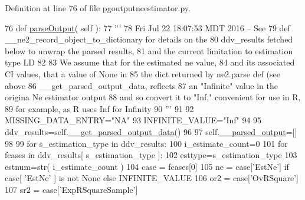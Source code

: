 Definition at line 76 of file pgoutputneestimator.\+py.


\begin{DoxyCode}
76     \textcolor{keyword}{def }\hyperlink{classnegui_1_1pgoutputneestimator_1_1PGOutputNeEstimator_a7b6885cf565cb604ab24d7082858f57b}{parseOutput}( self ):
77         \textcolor{stringliteral}{'''}
78 \textcolor{stringliteral}{        Fri Jul 22 18:07:53 MDT 2016 -- See }
79 \textcolor{stringliteral}{        def \_\_ne2\_record\_object\_to\_dictionary for details on the}
80 \textcolor{stringliteral}{        ddv\_results fetched below to unwrap the parsed results,}
81 \textcolor{stringliteral}{        and the current limitation to estimation type LD}
82 \textcolor{stringliteral}{}
83 \textcolor{stringliteral}{        We assume that for the estimated ne value,}
84 \textcolor{stringliteral}{        and its associated CI values, that a value of None in}
85 \textcolor{stringliteral}{        the dict returned by ne2.parse def (see above }
86 \textcolor{stringliteral}{        \_\_get\_parsed\_output\_data, reflects}
87 \textcolor{stringliteral}{        an "Infinite" value in the origina Ne estimator output}
88 \textcolor{stringliteral}{        and so convert it to "Inf,"  convenient for use in R,}
89 \textcolor{stringliteral}{        for example, as R uses Inf for Infinity}
90 \textcolor{stringliteral}{        '''}
91 
92         MISSING\_DATA\_ENTRY=\textcolor{stringliteral}{"NA"}
93         INFINITE\_VALUE=\textcolor{stringliteral}{"Inf"}
94 
95         ddv\_results=self.\hyperlink{classnegui_1_1pgoutputneestimator_1_1PGOutputNeEstimator_a70fbaa3f31f7d7c3ec0fdea15e923680}{\_\_get\_parsed\_output\_data}()
96 
97         self.\hyperlink{classnegui_1_1pgoutputneestimator_1_1PGOutputNeEstimator_a3579f427ddfe05902a6f4e3301704191}{\_\_parsed\_output}=[]
98 
99         \textcolor{keywordflow}{for} s\_estimation\_type \textcolor{keywordflow}{in} ddv\_results:
100             i\_estimate\_count=0
101             \textcolor{keywordflow}{for} fcases \textcolor{keywordflow}{in} ddv\_results[ s\_estimation\_type ]:
102                 esttype=s\_estimation\_type
103                 estnum=str( i\_estimate\_count )
104                 case = fcases[0] 
105                 ne = case[\textcolor{stringliteral}{'EstNe'}]  \textcolor{keywordflow}{if} case[ \textcolor{stringliteral}{'EstNe'} ] \textcolor{keywordflow}{is} \textcolor{keywordflow}{not} \textcolor{keywordtype}{None} \textcolor{keywordflow}{else} INFINITE\_VALUE
106                 or2 = case[\textcolor{stringliteral}{'OvRSquare'}] 
107                 sr2 = case[\textcolor{stringliteral}{'ExpRSquareSample'}] 

\end{DoxyCode}
